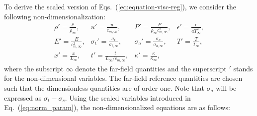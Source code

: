 \documentclass[review]{elsarticle}
\newcommand{\eqt}[1]{Eq.~(\ref{#1})}                     %
\newcommand{\eqts}[1]{Eqs.~(\ref{#1})}                     %
\newcommand{\tcr}[1]{\textcolor{red}{#1}}
\newcommand{\tcb}[1]{\textcolor{blue}{#1}}
\begin{document}
To derive the scaled version of \eqts{eq:equation-visc-reg}, we consider the following non-dimensionalization:
%
\begin{equation}
\label{eq:norm_param}
\begin{array}{llll}
\rho'   = \frac{\rho}{\rho_\infty}           , & 
u'      = \frac{u}{c_{m,\infty}}                 , & 
P'      = \frac{P}{\rho_\infty c^2_{m,\infty}}   , & 
\epsilon'      = \frac{\epsilon}{a T_\infty^4 }              , \\
E'      = \frac{E}{c^2_{m,\infty} }              , & 
\sigma_t'      = \frac{\sigma_t}{\sigma_{t,\infty} }              , & 
\sigma_a'      = \frac{\sigma_a}{\sigma_{a,\infty} }              , & 
T'      = \frac{T}{T_\infty }              , \\
x' = \frac{x}{L_\infty}                      , & 
t' = \frac{t}{L_\infty / c_{m,\infty}}       , &  
\kappa' = \frac{\kappa}{\kappa_\infty}       ,
\end{array}
\end{equation}
%
where  the subscript $\infty$ denote the far-field quantities and the superscript $'$ 
stands for the non-dimensional variables. The far-field reference quantities are chosen such that the 
dimensionless quantities are of order one. Note that $\sigma_a$ will be expressed as $\sigma_t - \sigma_s$.  Using the scaled variables introduced in \eqt{eq:norm_param}, the non-dimensionalized equations are as follows:
%
\end{document}
